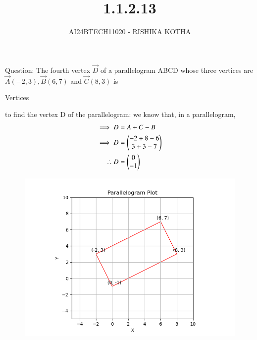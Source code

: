 \documentclass[journal]{IEEEtran}
\begin{document}

\vspace{3cm}

\title{1.1.2.13}
\author{AI24BTECH11020 - RISHIKA KOTHA}
{\let\newpage\relax\maketitle}

\renewcommand{\thefigure}{\theenumi}
\renewcommand{\thetable}{\theenumi}
\setlength{\intextsep}{10pt} %


\renewcommand{\thetable}{\theenumi}

Question:
The fourth vertex $\vec{D}$ of a parallelogram ABCD whose three vertices are $\vec{A}(-2, 3),\vec{B}(6, 7)$ and $\vec{C}(8, 3)$ is
\\
\solution
\begin{table}[h!]    
  \centering
  
  \caption{Vertices}
  \label{tab1.2.13.1}
\end{table}
to find the vertex D of the parallelogram: 
we know that, in a parallelogram,
\begin{align}
	\implies	D&=A+C-B\\
	\implies        D&=\begin{pmatrix}-2+8-6\\3+3-7\end{pmatrix}\\
	\therefore	D&=\begin{pmatrix}0\\-1\end{pmatrix}\\
\end{align}
\begin{figure}[h!]
   \centering
   \includegraphics[width=0.7\linewidth]{fig/Figure_1.png}
   \label{parallelogram graph}
\end{figure}
 
\end{document}

